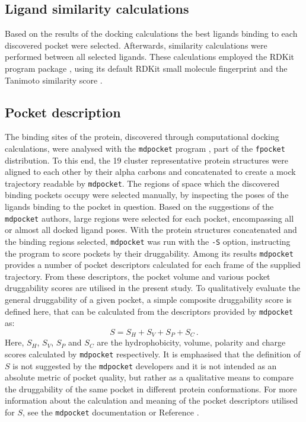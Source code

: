 \subsection{Ligand similarity calculations}
Based on the results of the docking calculations the best ligands binding to each discovered pocket were selected.
Afterwards, similarity calculations were performed between all selected ligands.
These calculations employed the RDKit program package \cite{rdkit}, using its default RDKit small molecule fingerprint and the Tanimoto similarity score \cite{tanimoto}.

\subsection{Pocket description}\label{sec:results:comp_details:pocket_description}
The binding sites of the protein, discovered through computational docking calculations, were analysed with the \texttt{mdpocket} program \cite{mdpocket}, part of the \texttt{fpocket} distribution.
To this end, the 19 cluster representative protein structures were aligned to each other by their alpha carbons and concatenated to create a mock trajectory readable by \texttt{mdpocket}.
The regions of space which the discovered binding pockets occupy were selected manually, by inspecting the poses of the ligands binding to the pocket in question.
Based on the suggestions of the \texttt{mdpocket} authors, large regions were selected for each pocket, encompassing all or almost all docked ligand poses.
With the protein structures concatenated and the binding regions selected, \texttt{mdpocket} was run with the \texttt{-S} option, instructing the program to score pockets by their druggability.
Among its results \texttt{mdpocket} provides a number of pocket descriptors calculated for each frame of the supplied trajectory.
From these descriptors, the pocket volume and various pocket druggability scores are utilised in the present study.
To qualitatively evaluate the general druggability of a given pocket, a simple composite druggability score is defined here, that can be calculated from the descriptors provided by \texttt{mdpocket} as:
\begin{equation}
S = S_H + S_V + S_P + S_C  \, .
\label{eqn:pocket_score}
\end{equation}
Here, $S_H$, $S_V$, $S_P$ and $S_C$ are the hydrophobicity, volume, polarity and charge scores calculated by \texttt{mdpocket} respectively.
It is emphasised that the definition of $S$ is not suggested by the \texttt{mdpocket} developers and it is not intended as an absolute metric of pocket quality, but rather as a qualitative means to compare the druggability of the same pocket in different protein conformations.
For more information about the calculation and meaning of the pocket descriptors utilised for $S$, see the \texttt{mdpocket} documentation or Reference .

